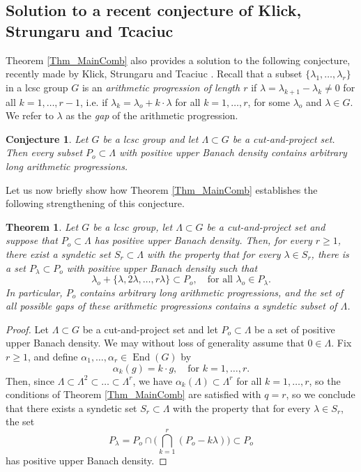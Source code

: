 \documentclass[12pt,reqno,a4paper]{amsart}
\numberwithin{equation}{section}
\DeclareMathOperator{\End}{End}
\theoremstyle{theorem}
\newtheorem{theorem}{Theorem}[section]
\newtheorem{conjecture}{Conjecture}[section]
\theoremstyle{task}
\theoremstyle{definition}
\begin{document}
\subsection{Solution to a recent conjecture of Klick, Strungaru and Tcaciuc}

Theorem \ref{Thm_MainComb} also provides a solution to the following conjecture, recently made by Klick, Strungaru and Tcaciuc \cite[Conjecture 6.7]{KST}. Recall
that a subset $\{\lambda_1,\ldots,\lambda_r\}$ in a lcsc group $G$ is an 
\emph{arithmetic progression of length $r$} if $\lambda = \lambda_{k+1} - \lambda_k \neq 0$ for all $k=1,\ldots,r-1$, i.e. if $\lambda_k = \lambda_o + k \cdot \lambda$
for all $k=1,\ldots,r$, for some $\lambda_o$ and $\lambda \in G$. We refer to 
$\lambda$ as the \emph{gap} of the arithmetic progression.

\begin{conjecture}
Let $G$ be a lcsc group and let $\Lambda \subset G$ be a cut-and-project set.
Then every subset $P_o \subset \Lambda$ with positive upper Banach density 
contains arbitrary long arithmetic progressions.
\end{conjecture}

Let us now briefly show how Theorem \ref{Thm_MainComb} establishes the following strengthening of this conjecture. 

\begin{theorem}
Let $G$ be a lcsc group, let $\Lambda \subset G$ be a cut-and-project set and 
suppose that $P_o \subset \Lambda$ has positive upper Banach density. Then, for
every $r \geq 1$, there exist a syndetic set $S_r \subset \Lambda$ with the property
that for every $\lambda \in S_r$, there is a set $P_\lambda \subset P_o$ with positive upper Banach density such that
\[
\lambda_o + \{\lambda,2 \lambda,\ldots,r\lambda\} \subset P_o, \quad \textrm{for all $\lambda_o \in P_\lambda$}.
\]
In particular, $P_o$ contains
arbitrary long arithmetic progressions, and the set of all possible gaps of these 
arithmetic progressions contains a syndetic subset of $\Lambda$.
\end{theorem}

\begin{proof}
Let $\Lambda \subset G$ be a cut-and-project set and let $P_o \subset \Lambda$ be a
set of positive upper Banach density. We may without loss of generality assume that $0 \in \Lambda$. Fix $r \geq 1$, and define $\alpha_1,\ldots,\alpha_r \in \End(G)$ by
\[
\alpha_k(g) = k \cdot g, \quad \textrm{for $k=1,\ldots,r$}.
\]
Then, since $\Lambda  \subset \Lambda^2 \subset \ldots \subset \Lambda^r$, we have $\alpha_k(\Lambda) \subset \Lambda^{r}$ for all $k=1,\ldots,r$, so the conditions of 
Theorem \ref{Thm_MainComb} are satisfied with $q=r$, so we conclude that there exists a syndetic set $S_r \subset \Lambda$ with the property that for every $\lambda \in S_r$, the set
\[
P_\lambda = P_o \cap \Big( \bigcap_{k=1}^r (P_o - k \lambda) \Big) \subset P_o
\]
has positive upper Banach density. 
\end{proof}
\end{document}
